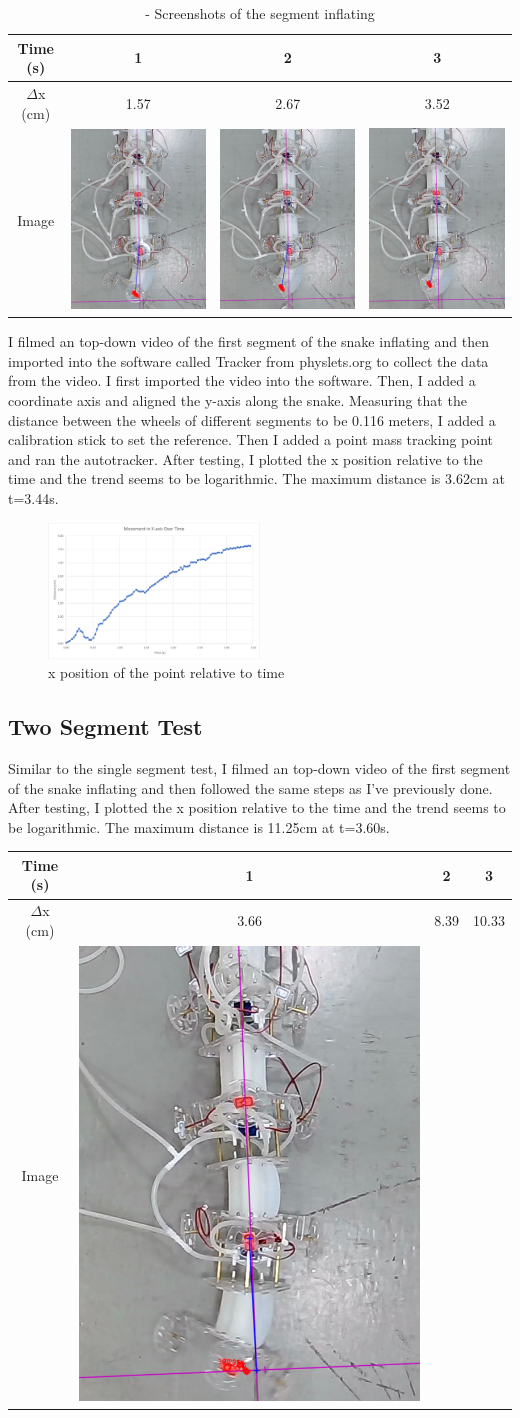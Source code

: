 \documentclass[twoside, 11pt]{article}
\begin{document}
\begin{table} [H]
	\centering
	\begin{tabular}{|c|c|c|c|}
	\hline
	Time (s) & 1 & 2 & 3\\
	\hline
	$\Delta$x (cm) & 1.57 & 2.67 & 3.52\\
	\hline
	Image & \includegraphics[align=c, scale=0.2]{1} & \includegraphics[align=c, scale=0.2]{2} & \includegraphics[align=c, scale=0.2]{3}\\
	\hline
	\end{tabular}
	\caption{- Screenshots of the segment inflating}
\end{table}
I filmed an top-down video of the first segment of the snake inflating and then imported into the software called Tracker from physlets.org to collect the data from the video. I first imported the video into the software. Then, I added a coordinate axis and aligned the y-axis along the snake. Measuring that the distance between the wheels of different segments to be 0.116 meters, I added a calibration stick to set the reference. Then I added a point mass tracking point and ran the autotracker. After testing, I plotted the x position relative to the time and the trend seems to be logarithmic. The maximum distance is 3.62cm at t=3.44s.
\begin{figure} [H]
\centering
\includegraphics[width=0.5\textwidth]{single seg}
\caption{x position of the point relative to time}
\end{figure}

\subsection{Two Segment Test}
Similar to the single segment test, I filmed an top-down video of the first segment of the snake inflating and then followed the same steps as I've previously done. After testing, I plotted the x position relative to the time and the trend seems to be logarithmic. The maximum distance is 11.25cm at t=3.60s.

\begin{table} [H]
	\centering
	\begin{tabular}{|c|c|c|c|}
	\hline
	Time (s) & 1 & 2 & 3\\
	\hline
	$\Delta$x (cm) & 3.66 & 8.39 & 10.33\\
	\hline
	Image & aphics[align=c, scale=0.2]{11} & \includegr
\end{tabular}
\end{table}
\end{document}
